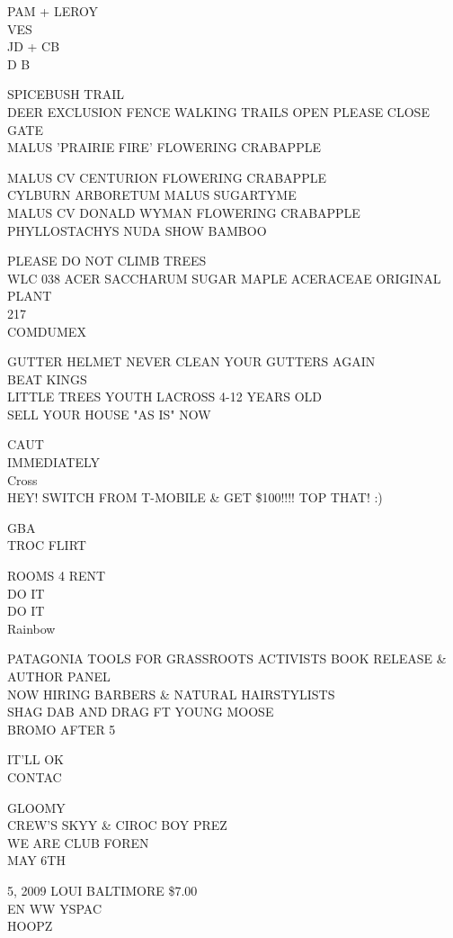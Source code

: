 \documentclass[10pt,letterpaper]{article}
\begin{document}
PAM + LEROY\\
VES\\
JD + CB\\
D B

SPICEBUSH TRAIL\\
DEER EXCLUSION FENCE WALKING TRAILS OPEN PLEASE CLOSE GATE\\
MALUS 'PRAIRIE FIRE' FLOWERING CRABAPPLE

MALUS CV CENTURION FLOWERING CRABAPPLE\\
CYLBURN ARBORETUM MALUS SUGARTYME\\
MALUS CV DONALD WYMAN FLOWERING CRABAPPLE\\
PHYLLOSTACHYS NUDA SHOW BAMBOO

PLEASE DO NOT CLIMB TREES\\
WLC 038 ACER SACCHARUM SUGAR MAPLE ACERACEAE ORIGINAL PLANT\\
217\\
COMDUMEX

GUTTER HELMET NEVER CLEAN YOUR GUTTERS AGAIN\\
BEAT KINGS\\
LITTLE TREES YOUTH LACROSS 4{-}12 YEARS OLD\\
SELL YOUR HOUSE "AS IS" NOW

CAUT\\
IMMEDIATELY\\
Cross\\
HEY!  SWITCH FROM T{-}MOBILE \& GET \$100!!!! TOP THAT! :)

GBA\\
TROC FLIRT

ROOMS 4 RENT\\
DO IT\\
DO IT\\
Rainbow

PATAGONIA TOOLS FOR GRASSROOTS ACTIVISTS BOOK RELEASE \& AUTHOR PANEL\\
NOW HIRING BARBERS \& NATURAL HAIRSTYLISTS\\
SHAG DAB AND DRAG FT YOUNG MOOSE\\
BROMO AFTER 5

IT'LL OK\\
CONTAC

GLOOMY\\
CREW'S SKYY \& CIROC BOY PREZ\\
WE ARE CLUB FOREN\\
MAY 6TH

5, 2009 LOUI BALTIMORE \$7.00\\
EN WW YSPAC\\
HOOPZ
\end{document}
